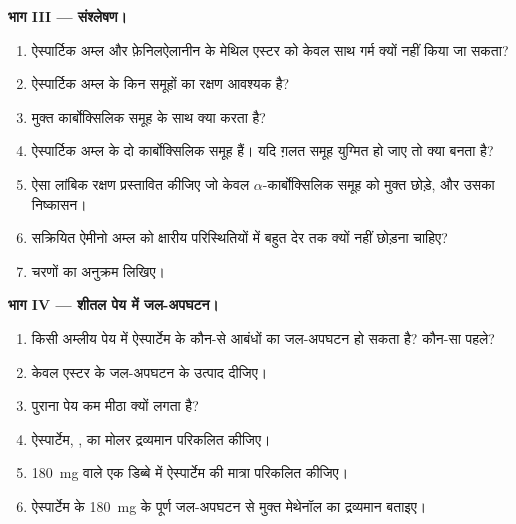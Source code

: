 \begin{problem}
\medskip
\noindent\textbf{भाग III --- संश्लेषण।}
\begin{enumerate}[resume]
  \item ऐस्पार्टिक अम्ल और फ़ेनिलऐलानीन के मेथिल एस्टर को केवल साथ गर्म क्यों नहीं किया जा सकता?
  \item ऐस्पार्टिक अम्ल के किन समूहों का रक्षण आवश्यक है?
  \item {} मुक्त कार्बोक्सिलिक समूह के साथ क्या करता है?
  \item ऐस्पार्टिक अम्ल के दो कार्बोक्सिलिक समूह हैं। यदि ग़लत समूह युग्मित हो जाए तो क्या बनता है?
  \item ऐसा लांबिक रक्षण प्रस्तावित कीजिए जो केवल $\alpha$-कार्बोक्सिलिक समूह को मुक्त छोड़े, और उसका
        निष्कासन।
  \item सक्रियित ऐमीनो अम्ल को क्षारीय परिस्थितियों में बहुत देर तक क्यों नहीं छोड़ना चाहिए?
  \item चरणों का अनुक्रम लिखिए।
\end{enumerate}

\medskip
\noindent\textbf{भाग IV --- शीतल पेय में जल-अपघटन।}
\begin{enumerate}[resume]
  \item किसी अम्लीय पेय में ऐस्पार्टेम के कौन-से आबंधों का जल-अपघटन हो सकता है? कौन-सा पहले?
  \item केवल एस्टर के जल-अपघटन के उत्पाद दीजिए।
  \item पुराना पेय कम मीठा क्यों लगता है?
  \item ऐस्पार्टेम, , का मोलर द्रव्यमान परिकलित कीजिए।
  \item \qty{180}{mg} वाले एक डिब्बे में ऐस्पार्टेम की मात्रा परिकलित कीजिए।
  \item ऐस्पार्टेम के \qty{180}{mg} के पूर्ण जल-अपघटन से मुक्त मेथेनॉल का द्रव्यमान
        बताइए।
\end{enumerate}
\end{problem}

